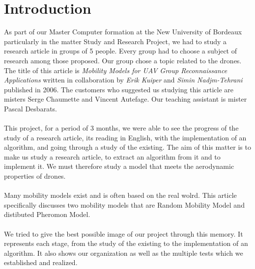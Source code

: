 \chapter*{Introduction}

As part of our Master Computer formation at the New University of Bordeaux particularly in the matter Study and Research Project, we had to study a research article in groups of 5 people. Every group had to choose a subject of research among those proposed. Our group chose a topic related to the drones. The title of this article is \textit{Mobility Models for UAV Group Reconnaissance Applications} written in collaboration by \textit{Erik Kuiper} and \textit{Simin Nadjm-Tehrani} published in 2006. The customers who suggested us studying this article are misters Serge Chaumette and Vincent Autefage. Our teaching assistant is mister Pascal Desbarats.
\\\\

This project, for a period of 3 months, we were able to see the progress of the study of a research article, its reading in English, with the implementation of an algorithm, and going through a study of the existing.
The aim of this matter is to make us study a research article, to extract an algorithm from it and to implement it.
We must therefore study a model that meets the aerodynamic properties of drones.
\\\\

Many mobility models exist and is often based on the real wolrd.
This article specifically discusses two mobility models that are Random Mobility Model and distibuted Pheromon Model.\\\\

We tried to give the best possible image of our project through this memory. It represents each stage, from the study of the existing to the implementation of an algorithm. It also shows our organization as well as the multiple tests which we established and realized. 
